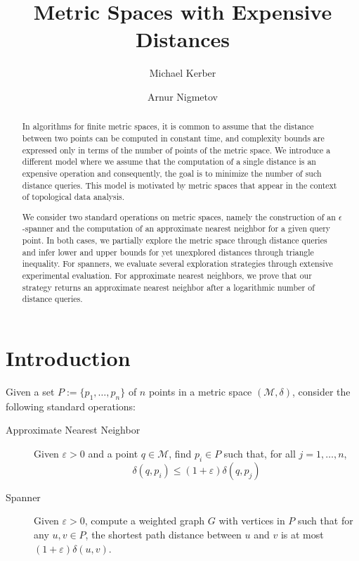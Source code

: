 \documentclass[a4paper,USenglish]{socg-lipics-v2018}
\title{Metric Spaces with Expensive Distances}
\author{Michael Kerber}{TU Graz}{kerber@tugraz.at}{}{}
\author{Arnur Nigmetov}{TU Graz}{nigmetov@tugraz.at}{}{}
\newcommand{\eps}{\varepsilon}
\newcommand{\metricspace}{\mathcal{M}}
\newcommand{\pointset}{P}
\newcommand{\dist}{\delta}
\begin{document}
\maketitle

\begin{abstract}
In algorithms for finite metric spaces, it is common
to assume that the distance between two points
can be computed in constant time, and complexity
bounds are expressed only in terms of the number
of points of the metric space.
We introduce a different model where we assume
that the computation of a single distance is
an expensive operation and consequently, the goal is
to minimize the number of such distance queries.
This model is motivated by metric spaces
that appear in the context of topological data analysis.

We consider two standard operations on metric spaces,
namely the construction of an $\epsilon$-spanner
and the computation of an approximate nearest
neighbor for a given query point.
In both cases, we partially explore the metric space
through distance queries and infer lower and upper bounds
for yet unexplored distances through triangle inequality.
For spanners, we evaluate several exploration strategies
through extensive experimental evaluation.
For approximate nearest neighbors, we prove that our
strategy returns an approximate nearest neighbor
after a logarithmic number of distance queries.
\end{abstract}

\section{Introduction}

Given a set $\pointset:=\{p_1,\ldots,p_n\}$ of $n$ points
in a metric space $(\metricspace,\dist)$, 
consider the following standard operations:

\begin{description}
\item[Approximate Nearest Neighbor] Given $\eps>0$ and a point $q\in\metricspace$,
find $p_i\in\pointset$ such that, for all $j=1,\ldots,n$,
\[\dist(q,p_i)\leq(1+\eps)\dist(q,p_j)\]

\item[Spanner] Given $\eps>0$, compute a weighted graph $G$ with vertices in $\pointset$
such that for any $u,v\in\pointset$, the shortest path distance between $u$ and $v$
is at most $(1+\eps)\dist(u,v)$.
\end{description}
\end{document}
